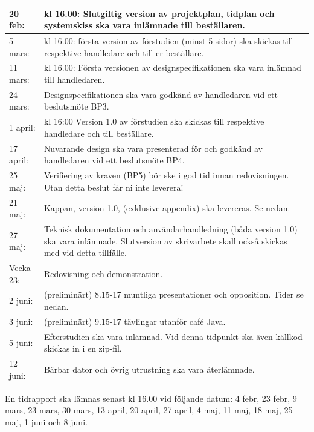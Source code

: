 \documentclass[11pt]{article}
\begin{document}
\begin{flushleft}
\begin{center}
\begin{longtable}{|l |p{.8\linewidth}|}
20 feb: & 
kl 16.00: Slutgiltig version av projektplan, tidplan och systemskiss ska vara inlämnade till beställaren. \\ \hline

5 mars: &
kl 16.00: första version av förstudien (minst 5 sidor) ska skickas till respektive handledare och till er beställare. \\ \hline

11 mars: & 
kl 16.00: Första versionen av designspecifikationen ska vara inlämnad till handledaren. \\ \hline

24 mars: &
Designspecifikationen ska vara godkänd av handledaren vid ett beslutsmöte BP3. \\ \hline

1 april: &
kl 16:00 Version 1.0 av förstudien ska skickas till respektive handledare och till beställare. \\ \hline

17 april: & 
Nuvarande design ska vara presenterad för och godkänd av handledaren vid ett beslutsmöte BP4. \\ \hline

25 maj: &
Verifiering av kraven (BP5) bör ske i god tid innan redovisningen. Utan detta beslut får ni inte leverera! \\ \hline

21 maj: &
Kappan, version 1.0, (exklusive appendix) ska levereras. Se nedan. \\ \hline

27 maj: &
Teknisk dokumentation och användarhandledning (båda version 1.0) ska vara inlämnade. Slutversion av skrivarbete skall också skickas med vid detta tillfälle. \\ \hline

Vecka 23: &
Redovisning och demonstration.\\ \hline

2 juni: &
(preliminärt) 8.15-17 muntliga presentationer och opposition. Tider se nedan. \\ \hline

3 juni: &
(preliminärt) 9.15-17 tävlingar utanför café Java. \\ \hline

5 juni: &
Efterstudien ska vara inlämnad. Vid denna tidpunkt ska även källkod skickas in i en zip-fil. \\ \hline

12 juni: &
Bärbar dator och övrig utrustning ska vara återlämnade. \\ \hline
\end{longtable}
\end{center}
En tidrapport ska lämnas senast kl 16.00 vid följande datum: 4 febr, 23 febr, 9 mars, 23 mars, 30 mars, 13 april, 20 april, 27 april, 4 maj, 11 maj, 18 maj, 25 maj, 1 juni och 8 juni.


\end{flushleft}
\end{document}

